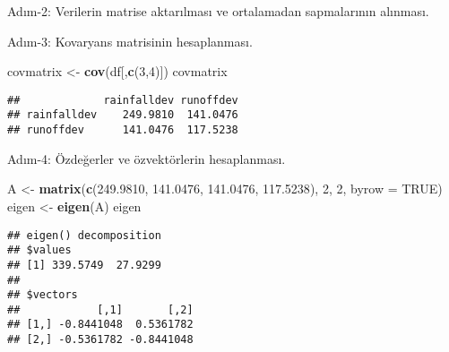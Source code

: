 \documentclass[
]{book}
\newenvironment{Shaded}{\begin{snugshade}}{\end{snugshade}}
\newcommand{\DataTypeTok}[1]{\textcolor[rgb]{0.13,0.29,0.53}{#1}}
\newcommand{\DecValTok}[1]{\textcolor[rgb]{0.00,0.00,0.81}{#1}}
\newcommand{\FloatTok}[1]{\textcolor[rgb]{0.00,0.00,0.81}{#1}}
\newcommand{\KeywordTok}[1]{\textcolor[rgb]{0.13,0.29,0.53}{\textbf{#1}}}
\newcommand{\NormalTok}[1]{#1}
\newcommand{\OperatorTok}[1]{\textcolor[rgb]{0.81,0.36,0.00}{\textbf{#1}}}
\newcommand{\OtherTok}[1]{\textcolor[rgb]{0.56,0.35,0.01}{#1}}
\newcommand{\StringTok}[1]{\textcolor[rgb]{0.31,0.60,0.02}{#1}}
\begin{document}
Adım-2: Verilerin matrise aktarılması ve ortalamadan sapmalarının alınması.

\begin{Shaded}
\end{Shaded}

Adım-3: Kovaryans matrisinin hesaplanması.

\begin{Shaded}
\begin{Highlighting}[]
\NormalTok{covmatrix <-}\StringTok{ }\KeywordTok{cov}\NormalTok{(df[,}\KeywordTok{c}\NormalTok{(}\DecValTok{3}\NormalTok{,}\DecValTok{4}\NormalTok{)])}
\NormalTok{covmatrix}
\end{Highlighting}
\end{Shaded}

\begin{verbatim}
##             rainfalldev runoffdev
## rainfalldev    249.9810  141.0476
## runoffdev      141.0476  117.5238
\end{verbatim}

Adım-4: Özdeğerler ve özvektörlerin hesaplanması.

\begin{Shaded}
\begin{Highlighting}[]
\NormalTok{A <-}\StringTok{ }\KeywordTok{matrix}\NormalTok{(}\KeywordTok{c}\NormalTok{(}\FloatTok{249.9810}\NormalTok{, }\FloatTok{141.0476}\NormalTok{, }\FloatTok{141.0476}\NormalTok{, }\FloatTok{117.5238}\NormalTok{), }\DecValTok{2}\NormalTok{, }\DecValTok{2}\NormalTok{, }\DataTypeTok{byrow =} \OtherTok{TRUE}\NormalTok{)}
\NormalTok{eigen <-}\StringTok{ }\KeywordTok{eigen}\NormalTok{(A)}
\NormalTok{eigen}
\end{Highlighting}
\end{Shaded}

\begin{verbatim}
## eigen() decomposition
## $values
## [1] 339.5749  27.9299
## 
## $vectors
##            [,1]       [,2]
## [1,] -0.8441048  0.5361782
## [2,] -0.5361782 -0.8441048
\end{verbatim}
\end{document}
